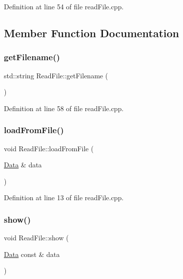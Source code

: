Definition at line 54 of file read\+File.\+cpp.



\subsection{Member Function Documentation}
\mbox{\label{class_read_file_a9835264c9ec95cfdbc1349573402fc01}} 
\subsubsection{\texorpdfstring{get\+Filename()}{getFilename()}}
{\footnotesize\ttfamily std\+::string Read\+File\+::get\+Filename (\begin{DoxyParamCaption}{ }\end{DoxyParamCaption})}







Definition at line 58 of file read\+File.\+cpp.

\mbox{\label{class_read_file_a232df426223b84e4dbb3f964ee4c3177}} 
\subsubsection{\texorpdfstring{load\+From\+File()}{loadFromFile()}}
{\footnotesize\ttfamily void Read\+File\+::load\+From\+File (\begin{DoxyParamCaption}\item[{\mbox{\hyperlink{struct_data}{Data}} \&}]{data }\end{DoxyParamCaption})}







Definition at line 13 of file read\+File.\+cpp.

\mbox{\label{class_read_file_a5efc41b900510ae038dafc23a2563300}} 
\subsubsection{\texorpdfstring{show()}{show()}}
{\footnotesize\ttfamily void Read\+File\+::show (\begin{DoxyParamCaption}\item[{\mbox{\hyperlink{struct_data}{Data}} const \&}]{data }\end{DoxyParamCaption})}







